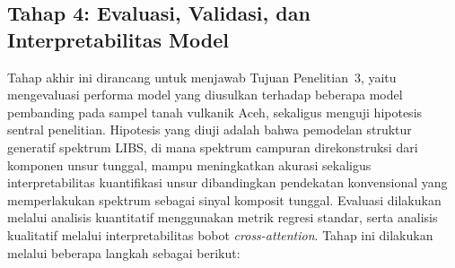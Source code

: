 \subsection{Tahap 4: Evaluasi, Validasi, dan Interpretabilitas Model}

Tahap akhir ini dirancang untuk menjawab Tujuan Penelitian~3, yaitu mengevaluasi performa model yang diusulkan terhadap beberapa model pembanding pada sampel tanah vulkanik Aceh, sekaligus menguji hipotesis sentral penelitian. Hipotesis yang diuji adalah bahwa pemodelan struktur generatif spektrum LIBS, di mana spektrum campuran direkonstruksi dari komponen unsur tunggal, mampu meningkatkan akurasi sekaligus interpretabilitas kuantifikasi unsur dibandingkan pendekatan konvensional yang memperlakukan spektrum sebagai sinyal komposit tunggal. Evaluasi dilakukan melalui analisis kuantitatif menggunakan metrik regresi standar, serta analisis kualitatif melalui interpretabilitas bobot \textit{cross-attention}. Tahap ini dilakukan melalui beberapa langkah sebagai berikut:

